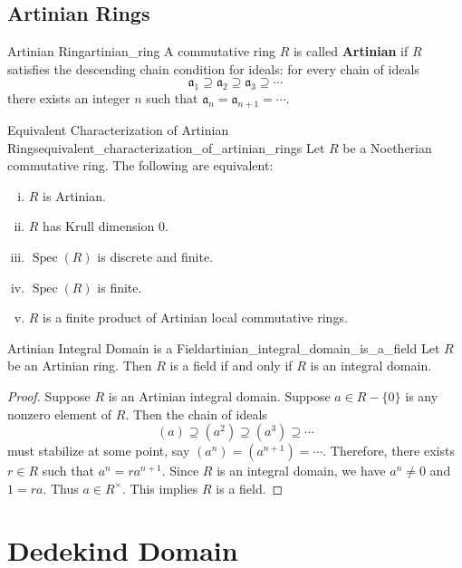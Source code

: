 \subsection{Artinian Rings}
\begin{definition}{Artinian Ring}{artinian_ring}
    A commutative ring $R$ is called \textbf{Artinian} if $R$ satisfies the descending chain condition for ideals: for every chain of ideals
    \[
    \mathfrak{a}_1\supseteq\mathfrak{a}_2\supseteq\mathfrak{a}_3\supseteq\cdots
    \]
    there exists an integer $n$ such that $\mathfrak{a}_n=\mathfrak{a}_{n+1}=\cdots$.
\end{definition}

\begin{proposition}{Equivalent Characterization of Artinian Rings}{equivalent_characterization_of_artinian_rings}
    Let $R$ be a Noetherian commutative ring. The following are equivalent:
    \begin{enumerate}[(i)]
        \item $R$ is Artinian.
        \item $R$ has Krull dimension $0$.
        \item $\operatorname{Spec}(R)$ is discrete and finite.
        \item $\operatorname{Spec}(R)$ is finite.
        \item $R$ is a finite product of Artinian local commutative rings.
    \end{enumerate}

\end{proposition}

\begin{proposition}{Artinian Integral Domain is a Field}{artinian_integral_domain_is_a_field}
    Let $R$ be an Artinian ring. Then $R$ is a field if and only if $R$ is an integral domain.
\end{proposition}
\begin{proof}
    Suppose $R$ is an Artinian integral domain. Suppose $a\in R-\{0\}$ is any nonzero element of $R$. Then the chain of ideals
    \[
    (a)\supseteq (a^2)\supseteq (a^3)\supseteq\cdots
    \]
    must stabilize at some point, say $(a^n)=(a^{n+1})=\cdots$. Therefore, there exists $r\in R$ such that $a^n=ra^{n+1}$. Since $R$ is an integral domain, we have $a^n\ne0$ and $1=ra$. Thus $a \in R^\times$. This implies $R$ is a field.
\end{proof}

\section{Dedekind Domain}

